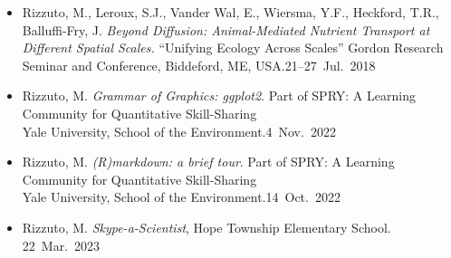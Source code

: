
\begin{itemize}
  \item \textcolor{awesome}{Rizzuto, M.}, Leroux, S.J., Vander Wal, E., Wiersma, Y.F., Heckford, T.R., Balluffi-Fry, J. \emph{Beyond Diffusion: Animal-Mediated Nutrient Transport at Different Spatial Scales.} ``Unifying Ecology Across Scales'' Gordon Research Seminar and Conference, Biddeford, ME, USA.\hfill 21--27~Jul.~2018
\end{itemize}


\begin{itemize}
  \item \textcolor{awesome}{Rizzuto, M.} \emph{Grammar of Graphics: ggplot2}. Part of SPRY: A Learning Community for Quantitative Skill-Sharing\\ Yale University, School of the Environment.\hfill 4~Nov.~2022
  \item \textcolor{awesome}{Rizzuto, M.} \emph{(R)markdown: a brief tour}. Part of SPRY: A Learning Community for Quantitative Skill-Sharing\\ Yale University, School of the Environment.\hfill 14~Oct.~2022
\end{itemize}

\begin{itemize}
  \item \textcolor{awesome}{Rizzuto, M.} \emph{Skype-a-Scientist}, Hope Township Elementary School. \hfill 22~Mar.~2023
\end{itemize}


